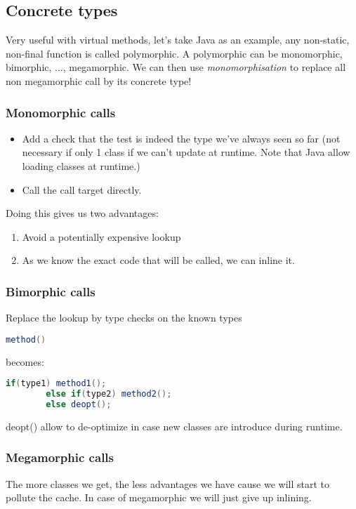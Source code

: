 \subsection{Concrete types}
Very useful with virtual methods, let's take Java as an example, any non-static,
non-final function is called polymorphic. A polymorphic can be monomorphic,
bimorphic, ..., megamorphic. We can then use \textit{monomorphisation} to
replace all non megamorphic call by its concrete type!

\subsubsection{Monomorphic calls}
\begin{itemize}
    \item Add a check that the test is indeed the type we've always seen so far
    (not necessary if only 1 class if we can't update at runtime. Note that Java
    allow loading classes at runtime.)
    \item Call the call target directly.
\end{itemize}
Doing this gives us two advantages:
\begin{enumerate}
    \item Avoid a potentially expensive lookup
    \item As we know the exact code that will be called, we can inline it.
\end{enumerate}
\subsubsection{Bimorphic calls}
    Replace the lookup by type checks on the known types
    \begin{lstlisting}[language=Java]
        method()
    \end{lstlisting}
    becomes:
    \begin{lstlisting}[language=Java]
        if(type1) method1();
        else if(type2) method2();
        else deopt();
    \end{lstlisting}
    deopt() allow to de-optimize in case new classes are introduce during runtime. 
\subsubsection{Megamorphic calls}
    The more classes we get, the less advantages we have cause we will start to
    pollute the cache. In case of megamorphic we will just give up inlining.
